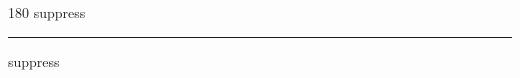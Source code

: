 
\begin{frame}
\begin{center}
\begin{turn}{180}
{\fontsize{2.5cm}{1em}\selectfont suppress}
\end{turn}
\vspace{1em}\par  
\hrule
\vspace{1em}\par  
{\fontsize{2.5cm}{1em}\selectfont suppress}
\end{center}
\end{frame}
